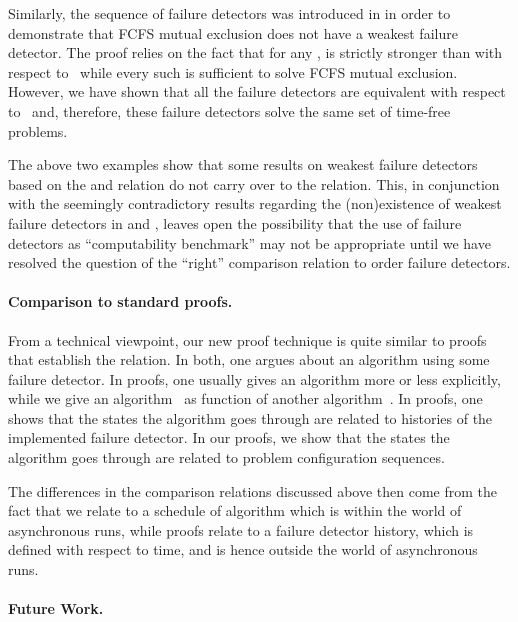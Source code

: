 \documentclass[11pt]{article}
\begin{document}
Similarly, the  sequence of failure detectors was introduced
     in \cite{bhatt:oteow} in order to demonstrate that FCFS mutual
     exclusion does not have a weakest failure detector.
The proof relies on the fact that for any ,  is strictly
     stronger than  with  respect to~
     while every such  is sufficient to solve FCFS mutual
     exclusion.
However, we have shown that all the  failure detectors are
     equivalent with respect to~ and, therefore, these
     failure detectors solve the same set of time-free problems.


The above two examples show that some results on weakest failure
     detectors based on the  and  relation do not
     carry over to the  relation.
This, in conjunction with the seemingly contradictory results
     regarding the (non)existence of weakest failure detectors in
     \cite{jayanti:ephawfd} and \cite{bhatt:oteow}, leaves open the
     possibility that the use of failure detectors as ``computability
     benchmark'' \cite{FGK11} may not be appropriate until we have
     resolved the question of the ``right'' comparison relation to
     order failure detectors.


\paragraph{Comparison to standard proofs.}

From a technical viewpoint, our new proof technique is  quite similar
     to proofs that establish the  relation.
In both, one argues about an algorithm using some failure detector.
In  proofs, one usually gives an algorithm more or less
     explicitly, while we give an algorithm~ as function of
     another algorithm~.
In  proofs, one shows that the states the algorithm goes
     through are related to histories of the implemented failure
     detector.
In our  proofs, we show that the states the algorithm goes
     through are related to problem configuration sequences.

The differences in the comparison relations discussed above then come
     from the fact that we relate to a schedule of algorithm  which
     is within the world of asynchronous runs, while  proofs
     relate to a failure detector history, which is defined with
     respect to time, and is hence outside the world of asynchronous
     runs.


\paragraph{Future Work.} 
\end{document}
